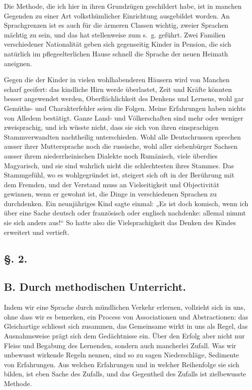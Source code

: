 Die Methode, die ich hier in ihren Grundzügen geschildert habe, ist in manchen Gegenden zu einer Art volksthümlicher Einrichtung ausgebildet worden. An Sprachgrenzen ist es auch für die ärmeren Classen wichtig, zweier Sprachen mächtig zu sein, und das hat stellenweise zum s.~g.  geführt. Zwei Familien verschiedener Nationalität geben sich gegenseitig Kinder in Pension, die sich natürlich im pflegeelterlichen Hause schnell die Sprache der neuen Heimath aneignen.

Gegen die  der Kinder in vielen wohlhabenderen Häusern wird von Manchen scharf geeifert: das kindliche Hirn werde überlastet, Zeit und Kräfte könnten besser angewendet werden, Oberflächlichkeit des Denkens und Lernens, wohl gar Gemüths- und Charakterfehler seien die Folgen. Meine Erfahrungen haben nichts von Alledem bestätigt. Ganze Land- und Völkerschaften sind mehr oder weniger zweisprachig, und ich wüsste nicht, dass sie sich von ihren einsprachigen Stammverwandten nachtheilig unterschieden. Wohl alle Deutschrussen sprechen ausser ihrer Muttersprache noch die russische, wohl aller siebenbürger Sachsen ausser ihrem niederrheinischen Dialekte noch Rumänisch, viele überdies Magyarisch, und sie sind wahrlich nicht die schlechtesten ihres Stammes. Das Stammgefühl, wo es wohlgegründet ist, steigert sich oft in der Berührung mit dem Fremden, und der Verstand muss an Vielseitigkeit und Objectivität gewinnen, wenn er gewohnt ist, die Dinge in verschiedenen Sprachen zu durchdenken. Ein neunjähriges Kind sagte einmal: „Es ist doch komisch, wenn ich über eine Sache deutsch oder französisch oder englisch nachdenke: alle\label{fp.72}mal nimmt sie sich anders aus!“ So hatte also die Vielsprachigkeit das Denken des Kindes erweitert und vertieft.

\label{sp.71}

\subsection*{§. 2.}\label{II.IV.2}
\subsection*{B. Durch methodischen Unterricht.}

Indem wir eine Sprache durch mündlichen Verkehr erlernen, vollzieht sich in uns, ohne dass wir es bemerken, ein Process von Associationen und Abstractionen: das Gleichartige schliesst sich zusammen, das Gemeinsame wirkt in uns als Regel, das Ausnahmsweise prägt sich dem Gedächtnisse ein. Über den Erfolg aber  nicht nur Fleiss und Begabung des Lernenden, sondern auch mancherlei Zufall. Was wir unbewusst wirkende Regeln nennen, sind so zu sagen Niederschläge, Sedimente von Erfahrungen. Aus welchen Erfahrungen und in welcher Reihenfolge sie sich bilden, ist eben Sache des Zufalls, und das Gegentheil des Zufalls ist zielbewusste Methode.

